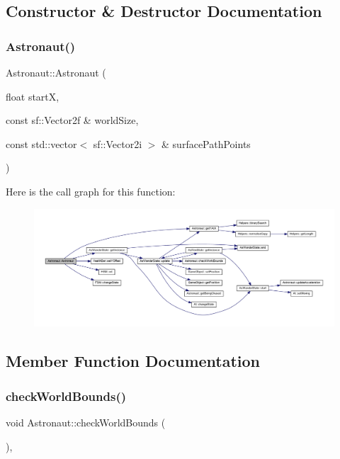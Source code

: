 \subsection{Constructor \& Destructor Documentation}
\mbox{\label{class_astronaut_a36a970b94e407cb7894f6ae2d3547449}} 
\subsubsection{\texorpdfstring{Astronaut()}{Astronaut()}}
{\footnotesize\ttfamily Astronaut\+::\+Astronaut (\begin{DoxyParamCaption}\item[{float}]{startX,  }\item[{const sf\+::\+Vector2f \&}]{world\+Size,  }\item[{const std\+::vector$<$ sf\+::\+Vector2i $>$ \&}]{surface\+Path\+Points }\end{DoxyParamCaption})}

Here is the call graph for this function\+:
\nopagebreak
\begin{figure}[H]
\begin{center}
\leavevmode
\includegraphics[width=350pt]{class_astronaut_a36a970b94e407cb7894f6ae2d3547449_cgraph}
\end{center}
\end{figure}


\subsection{Member Function Documentation}
\mbox{\label{class_astronaut_a362cf11f645801a8067efaa1f9310e4c}} 
\subsubsection{\texorpdfstring{check\+World\+Bounds()}{checkWorldBounds()}}
{\footnotesize\ttfamily void Astronaut\+::check\+World\+Bounds (\begin{DoxyParamCaption}{ }\end{DoxyParamCaption})\hspace{0.3cm}{\ttfamily [override]}, {\ttfamily [virtual]}}



